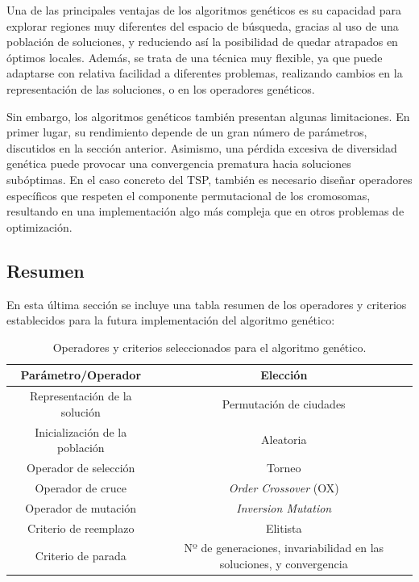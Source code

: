 Una de las principales ventajas de los algoritmos genéticos es su capacidad para explorar regiones muy diferentes del
espacio de búsqueda, gracias al uso de una población de soluciones, y reduciendo así la posibilidad de quedar atrapados 
en óptimos locales. Además, se trata de una técnica muy flexible, ya que puede adaptarse con relativa facilidad a diferentes
problemas, realizando cambios en la representación de las soluciones, o en los operadores genéticos.

Sin embargo, los algoritmos genéticos también presentan algunas limitaciones. En primer lugar, su rendimiento depende de 
un gran número de parámetros, discutidos en la sección anterior. Asimismo, una pérdida excesiva de diversidad genética 
puede provocar una convergencia prematura hacia soluciones subóptimas. En el caso concreto del TSP, también es necesario
diseñar operadores específicos que respeten el componente permutacional de los cromosomas, resultando en una implementación
algo más compleja que en otros problemas de optimización.

\subsection{Resumen}
\label{subsec:ga_summary}

En esta última sección se incluye una tabla resumen de los operadores y criterios establecidos para la futura implementación
del algoritmo genético:

\begin{table}[H]
    \renewcommand{\arraystretch}{1.3}
    \caption{Operadores y criterios seleccionados para el algoritmo genético.}
    \label{tab:ga_decisions}
    \begin{center}
        \begin{tabular}{|c|c|}
            \hline
            \textbf{Parámetro/Operador} & \textbf{Elección} \\
            \hline
            Representación de la solución & Permutación de ciudades \\
            \hline
            Inicialización de la población & Aleatoria \\
            \hline
            Operador de selección & Torneo \\
            \hline
            Operador de cruce & \textit{Order Crossover} (OX) \\
            \hline
            Operador de mutación & \textit{Inversion Mutation} \\
            \hline
            Criterio de reemplazo & Elitista \\
            \hline
            Criterio de parada & Nº de generaciones, invariabilidad en las soluciones, y convergencia \\
            \hline
        \end{tabular}
    \end{center}
\end{table}

